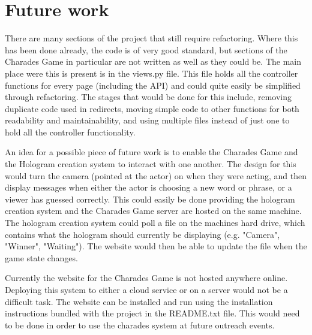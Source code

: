 \section{Future work}
There are many sections of the project that still require refactoring. Where this has been done already, the code is of very good standard, but sections of the Charades Game in particular are not written as well as they could be. The main place were this is present is in the views.py file. This file holds all the controller functions for every page (including the API) and could quite easily be simplified through refactoring. The stages that would be done for this include, removing duplicate code used in redirects, moving simple code to other functions for both readability and maintainability, and using multiple files instead of just one to hold all the controller functionality.

An idea for a possible piece of future work is to enable the Charades Game and the Hologram creation system to interact with one another. The design for this would turn the camera (pointed at the actor) on when they were acting, and then display messages when either the actor is choosing a new word or phrase, or a viewer has guessed correctly. This could easily be done providing the hologram creation system and the Charades Game server are hosted on the same machine. The hologram creation system could  poll a file on the machines hard drive, which contains what the hologram should currently be displaying (e.g. "Camera", "Winner", "Waiting"). The website would then be able to update the file when the game state changes.  

Currently the website for the Charades Game is not hosted anywhere online. Deploying this system to either a cloud service or on a server would not be a difficult task. The website can be installed and run using the installation instructions bundled with the project in the README.txt file. This would need to be done in order to use the charades system at future outreach events.
